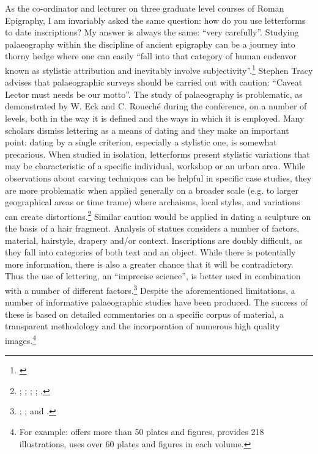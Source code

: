 \documentclass[amsthm,ebook]{saparticle}
\begin{document}
\noindent  As the co-ordinator and lecturer on three graduate level courses of Roman Epigraphy, I am invariably asked the same
question: how do you use letterforms to date inscriptions? My answer is always the same: ``very carefully''. Studying
palaeography within the discipline of ancient epigraphy can be a journey into thorny hedge where one can easily ``fall
into that category of human endeavor known as stylistic attribution and inevitably involve subjectivity''.\footnote{\citet[3-4]{tracy1995}} Stephen Tracy advises that palaeographic surveys should be carried out with caution: ``Caveat Lector
must needs be our motto''. The study of palaeography is problematic, as demonstrated by W. Eck and C. Roueché during the conference, on a number of levels, both in the way it is
defined and the ways in which it is employed. Many scholars dismiss lettering as a means of dating and they make an
important point: dating by a single criterion, especially a stylistic one, is somewhat precarious. When studied in
isolation, letterforms present stylistic variations that may be characteristic of a specific individual, workshop or an
urban area. While observations about carving techniques can be helpful in specific case studies, they are more
problematic when applied generally on a broader scale (e.g. to larger geographical areas or time trame) where
archaisms, local styles, and variations can create distortions.\footnote{\citet{susini1973}; \citet{petrucci1993}; \citet[163-181]{Manzella1995}; \citet[433]{cooley2012}; \citet[122-125]{bruun2015}.} Similar caution would be applied in dating a
sculpture on the basis of a hair fragment. Analysis of statues considers a number of factors, material, hairstyle,
drapery and/or context. Inscriptions are doubly difficult, as they fall into categories of both text and an object.
While there is potentially more information, there is also a greater chance that it will be contradictory. Thus the use
of lettering, an ``imprecise science'', is better used in combination with a number of different factors.\footnote{\citet[26-9]{harris1989}; \citet[3-5]{bodel2001}; \citet[393-418]{Manzella2007} and \citet[432-435]{cooley2012}.} Despite the
aforementioned limitations, a number of informative palaeographic studies have been produced. The success of these is
based on detailed commentaries on a specific corpus of material, a transparent methodology and the incorporation of
numerous high quality images.\footnote{ For example: \citet{Gordon1957} offers more than 50 plates and figures, \citet{Manzella1987} provides 218 illustrations, \citet{tracy1990,tracy1995,tracy2003} uses over 60 plates and figures in each volume.}
\end{document}
